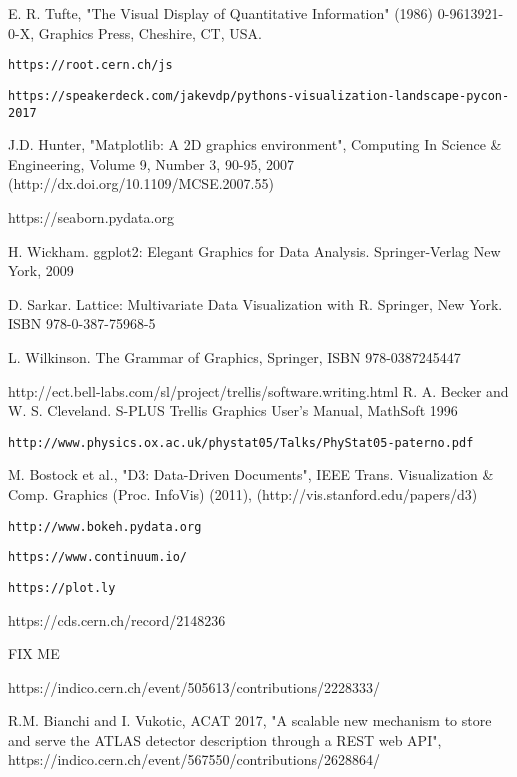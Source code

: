 \documentclass[12pt,a4paper]{article}
\begin{document}
\begin{thebibliography}{999}
 E. R. Tufte, "The Visual Display of Quantitative Information" (1986) 0-9613921-0-X, Graphics Press, Cheshire, CT, USA.

 {\tt https://root.cern.ch/js}

 {\tt https://speakerdeck.com/jakevdp/pythons-visualization-landscape-pycon-2017}

 J.D. Hunter, "Matplotlib: A 2D graphics environment", Computing In Science \& Engineering, Volume 9, Number 3, 90-95, 2007 (http://dx.doi.org/10.1109/MCSE.2007.55)

 https://seaborn.pydata.org

 H. Wickham. ggplot2: Elegant Graphics for Data Analysis. Springer-Verlag New York, 2009

 D. Sarkar. Lattice: Multivariate Data Visualization with R. Springer, New York. ISBN 978-0-387-75968-5

 L. Wilkinson. The Grammar of Graphics, Springer, ISBN 978-0387245447

 http://ect.bell-labs.com/sl/project/trellis/software.writing.html
 R. A. Becker and W. S. Cleveland. S-PLUS Trellis Graphics User's Manual, MathSoft 1996

 {\tt http://www.physics.ox.ac.uk/phystat05/Talks/PhyStat05-paterno.pdf}

 M. Bostock et al., "D3: Data-Driven Documents", IEEE Trans. Visualization \& Comp. Graphics (Proc. InfoVis) (2011), (http://vis.stanford.edu/papers/d3)

 {\tt http://www.bokeh.pydata.org}

 {\tt https://www.continuum.io/}

 {\tt https://plot.ly}


 https://cds.cern.ch/record/2148236

 FIX ME %

 https://indico.cern.ch/event/505613/contributions/2228333/


 R.M. Bianchi and I. Vukotic, ACAT 2017, "A scalable new mechanism to store and serve the ATLAS detector description through a REST web API", https://indico.cern.ch/event/567550/contributions/2628864/














\end{thebibliography}
\end{document}
